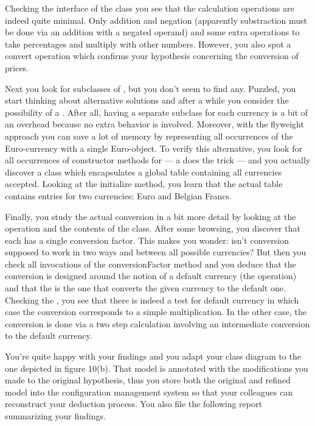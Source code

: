 \documentclass[a4paper,10pt,twoside]{book}
\begin{document}
Checking the interface of the  class you see that the calculation operations are 
indeed quite minimal. Only addition and negation (apparently substraction must be done via 
an addition with a negated operand) and some extra operations to take percentages and 
multiply with other numbers. However, you also spot a convert operation which confirms your 
hypothesis concerning the conversion of prices.

Next you look for subclasses of , but you don't seem to find any. Puzzled, 
you start thinking about alternative solutions and after a while you consider the 
possibility of a . After all, having a separate subclass for 
each currency is a bit of an overhead because no extra behavior is involved. Moreover, with 
the flyweight approach you can save a lot of memory by representing all occurrences of the 
Euro-currency with a single Euro-object. To verify this alternative, you look for all 
occurrences of constructor methods for  --- a  does the 
trick --- and you actually discover a class  which encapsulates a global 
table containing all currencies accepted. Looking at the initialize method, you learn that 
the actual table contains entries for two currencies: Euro and Belgian Francs.

Finally, you study the actual conversion in a bit more detail by looking at the 
 operation and the contents of the  class. After some 
browsing, you discover that each  has a single conversion factor. This makes 
you wonder: isn't conversion supposed to work in two ways and between all possible 
currencies? But then you check all invocations of the conversionFactor method and you 
deduce that the conversion is designed around the notion of a default currency (\ie the 
 operation) and that the  is the one that 
converts the given currency to the default one. Checking the , 
you see that there is indeed a test for default currency in which case the conversion 
corresponds to a simple multiplication. In the other case, the conversion is done via a two 
step calculation involving an intermediate conversion to the default currency.

You're quite happy with your findings and you adapt your class diagram to the one depicted 
in figure 10(b). That model is annotated with the modifications you made to the original 
hypothesis, thus you store both the original and refined model into the configuration 
management system so that your colleagues can reconstruct your deduction process. You also 
file the following report summarizing your findings.
\end{document}
